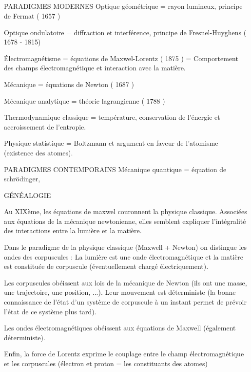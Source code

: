 \subsection{}
\begin{center}
\end{center}

\begin{comment}
\end{comment}

PARADIGMES MODERNES
	Optique géométrique = rayon lumineux, principe de Fermat ( 1657 )

	Optique ondulatoire = diffraction et interférence, principe de Fresnel-Huyghens ( 1678 - 1815)

	Électromagnétisme =  équations de Maxwel-Lorentz ( 1875 ) = Comportement des champs électromagnétique et interaction avec la matière.

	Mécanique = équations de Newton ( 1687 )

	Mécanique analytique = théorie lagrangienne ( 1788 )

	Thermodynamique classique = température, conservation de l'énergie et accroissement de l'entropie.

	Physique statistique = Boltzmann et argument en faveur de l'atomisme (existence des atomes).


PARADIGMES CONTEMPORAINS
	Mécanique quantique = équation de schrödinger, 

GÉNÉALOGIE

Au XIXème, les équations de maxwel couronnent la physique classique. Associées aux équations de la mécanique newtonienne, elles semblent expliquer l'intégralité des interactions entre la lumière et la matière.

Dans le paradigme de la physique classique (Maxwell + Newton) on distingue les ondes des corpuscules : La lumière est une onde électromagnétique et la matière est constituée de corpuscule (éventuellement chargé électriquement).

Les corpuscules obéissent aux lois de la mécanique de Newton (ils ont une masse, une trajectoire, une position, ...). Leur mouvement est déterministe (la bonne connaissance de l'état d'un système de corpuscule à un instant permet de prévoir l'état de ce système plus tard).

Les ondes électromagnétiques obéissent aux équations de Maxwell (également déterministe).

Enfin, la force de Lorentz exprime le couplage entre le champ électromagnétique et les corpuscules (électron et proton = les constituants des atomes)




